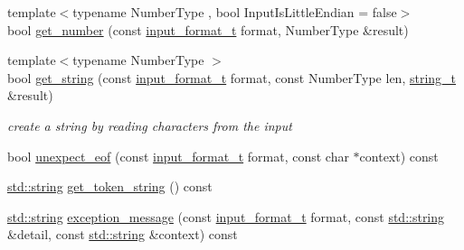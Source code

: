 \begin{DoxyCompactItemize}
\item 
{\footnotesize template$<$typename Number\+Type , bool Input\+Is\+Little\+Endian = false$>$ }\\bool \hyperlink{classnlohmann_1_1detail_1_1binary__reader_a161cda5919ea2436b7999c2a76656aba}{get\+\_\+number} (const \hyperlink{namespacenlohmann_1_1detail_aa554fc6a11519e4f347deb25a9f0db40}{input\+\_\+format\+\_\+t} format, Number\+Type \&result)
\item 
{\footnotesize template$<$typename Number\+Type $>$ }\\bool \hyperlink{classnlohmann_1_1detail_1_1binary__reader_a1f4b5da029a561c8711426b0a7316ec6}{get\+\_\+string} (const \hyperlink{namespacenlohmann_1_1detail_aa554fc6a11519e4f347deb25a9f0db40}{input\+\_\+format\+\_\+t} format, const Number\+Type len, \hyperlink{classnlohmann_1_1detail_1_1binary__reader_aa0b9729917ca7ee6ed01e3792341316e}{string\+\_\+t} \&result)
\begin{DoxyCompactList}\small\item\em create a string by reading characters from the input \end{DoxyCompactList}\item 
bool \hyperlink{classnlohmann_1_1detail_1_1binary__reader_a91dd7341d9d74c58866877ddfe58dd03}{unexpect\+\_\+eof} (const \hyperlink{namespacenlohmann_1_1detail_aa554fc6a11519e4f347deb25a9f0db40}{input\+\_\+format\+\_\+t} format, const char $\ast$context) const
\item 
\hyperlink{namespacenlohmann_1_1detail_a1ed8fc6239da25abcaf681d30ace4985ab45cffe084dd3d20d928bee85e7b0f21}{std\+::string} \hyperlink{classnlohmann_1_1detail_1_1binary__reader_acf8d3f7b17efd05655fcb6f47a2eaa79}{get\+\_\+token\+\_\+string} () const
\item 
\hyperlink{namespacenlohmann_1_1detail_a1ed8fc6239da25abcaf681d30ace4985ab45cffe084dd3d20d928bee85e7b0f21}{std\+::string} \hyperlink{classnlohmann_1_1detail_1_1binary__reader_a82b86133c98a0565446a44dfd3e418e6}{exception\+\_\+message} (const \hyperlink{namespacenlohmann_1_1detail_aa554fc6a11519e4f347deb25a9f0db40}{input\+\_\+format\+\_\+t} format, const \hyperlink{namespacenlohmann_1_1detail_a1ed8fc6239da25abcaf681d30ace4985ab45cffe084dd3d20d928bee85e7b0f21}{std\+::string} \&detail, const \hyperlink{namespacenlohmann_1_1detail_a1ed8fc6239da25abcaf681d30ace4985ab45cffe084dd3d20d928bee85e7b0f21}{std\+::string} \&context) const
\end{DoxyCompactItemize}
